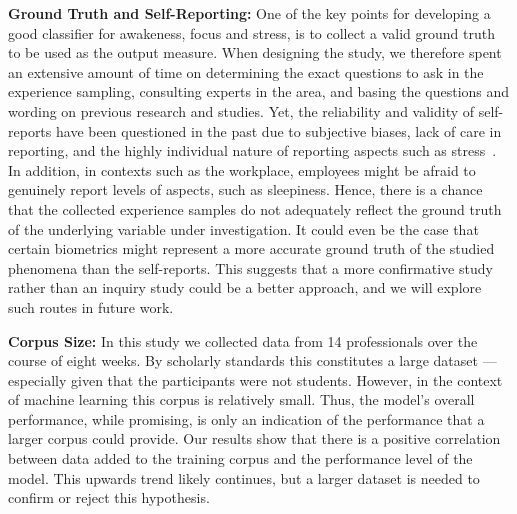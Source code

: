 \noindent
\textbf{Ground Truth and Self-Reporting:} 
One of the key points for developing a good classifier for awakeness, focus and stress, is to collect a valid ground truth to be used as the output measure. When designing the study, we therefore spent an extensive amount of time on determining the exact questions to ask in the experience sampling, consulting experts in the area, and basing the questions and wording on previous research and studies. Yet, the reliability and validity of self-reports have been questioned in the past due to subjective biases, lack of care in reporting, and the highly individual nature of reporting aspects such as stress~\cite{Hernandez11,Hovsepian15}. In addition, in contexts such as the workplace, employees might be afraid to genuinely report levels of aspects, such as sleepiness. Hence, there is a chance that the collected experience samples do not adequately reflect the ground truth of the underlying variable under investigation. It could even be the case that certain biometrics might represent a more accurate ground truth of the studied phenomena than the self-reports. This suggests that a more confirmative study rather than an inquiry study could be a better approach, and we will explore such routes in future work.


\noindent
\textbf{Corpus Size:}
In this study we collected data from 14 professionals over the course of eight weeks. By scholarly standards this constitutes a large dataset --- especially given that the participants were not students. However, in the context of machine learning this corpus is relatively small. Thus, the model's overall performance, while promising, is only an indication of the performance that a larger corpus could provide. Our results show that there is a positive correlation between data added to the training corpus and the performance level of the model. This upwards trend likely continues, but a larger dataset is needed to confirm or reject this hypothesis. 


